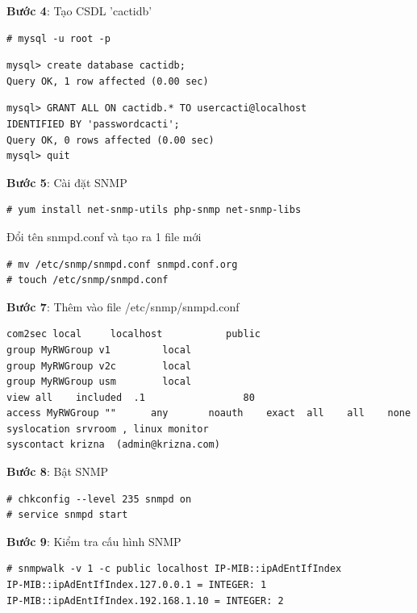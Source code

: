 \documentclass[12pt,oneside,a4paper,reqno]{report}
\begin{document}
\begin{large}
\textbf{Bước 4}: Tạo CSDL 'cactidb'

\begin{lstlisting}
# mysql -u root -p
\end{lstlisting}

\begin{lstlisting}
mysql> create database cactidb;
Query OK, 1 row affected (0.00 sec)
\end{lstlisting}

\begin{lstlisting}
mysql> GRANT ALL ON cactidb.* TO usercacti@localhost
IDENTIFIED BY 'passwordcacti';
Query OK, 0 rows affected (0.00 sec)
mysql> quit
\end{lstlisting}

\textbf{Bước 5}: Cài đặt SNMP

\begin{lstlisting}
# yum install net-snmp-utils php-snmp net-snmp-libs
\end{lstlisting}

Đổi tên snmpd.conf và tạo ra 1 file mới

\begin{lstlisting}
# mv /etc/snmp/snmpd.conf snmpd.conf.org
# touch /etc/snmp/snmpd.conf
\end{lstlisting}

\textbf{Bước 7}: Thêm vào file /etc/snmp/snmpd.conf

\begin{lstlisting}
com2sec local     localhost           public
group MyRWGroup v1         local
group MyRWGroup v2c        local
group MyRWGroup usm        local
view all    included  .1                 80
access MyRWGroup ""      any       noauth    exact  all    all    none
syslocation srvroom , linux monitor
syscontact krizna  (admin@krizna.com)
\end{lstlisting}

\textbf{Bước 8}: Bật SNMP

\begin{lstlisting}
# chkconfig --level 235 snmpd on
# service snmpd start
\end{lstlisting}

\textbf{Bước 9}: Kiểm tra cấu hình SNMP

\begin{lstlisting}
# snmpwalk -v 1 -c public localhost IP-MIB::ipAdEntIfIndex
IP-MIB::ipAdEntIfIndex.127.0.0.1 = INTEGER: 1
IP-MIB::ipAdEntIfIndex.192.168.1.10 = INTEGER: 2
\end{lstlisting}


\end{large}
\end{document}
